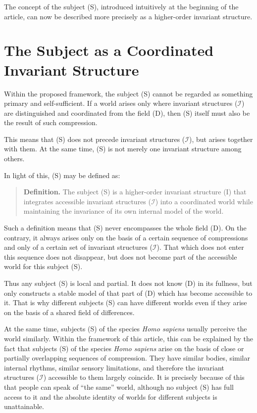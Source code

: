 \documentclass[aps,prd,onecolumn,nofootinbib,superscriptaddress]{revtex4-2} %
\begin{document}
    The concept of the subject (S), introduced intuitively at the beginning of the article, can now be described more precisely as a higher-order invariant structure.


    \section{The Subject as a Coordinated Invariant Structure}
    Within the proposed framework, the subject (S) cannot be regarded as something primary and self-sufficient. If a world arises only where invariant structures ($\mathcal{I}$) are distinguished and coordinated from the field (D), then (S) itself must also be the result of such compression.

    This means that (S) does not precede invariant structures ($\mathcal{I}$), but arises together with them. At the same time, (S) is not merely one invariant structure among others.

    In light of this, (S) may be defined as:
    \begin{quote}
        \textbf{Definition.}
        The subject (S) is a higher-order invariant structure (I) that integrates accessible invariant structures ($\mathcal{I}$) into a coordinated world while maintaining the invariance of its own internal model of the world.
    \end{quote}

    Such a definition means that (S) never encompasses the whole field (D). On the contrary, it always arises only on the basis of a certain sequence of compressions and only of a certain set of invariant structures ($\mathcal{I}$). That which does not enter this sequence does not disappear, but does not become part of the accessible world for this subject (S).

    Thus any subject (S) is local and partial. It does not know (D) in its fullness, but only constructs a stable model of that part of (D) which has become accessible to it. That is why different subjects (S) can have different worlds even if they arise on the basis of a shared field of differences.

    At the same time, subjects (S) of the species \emph{Homo sapiens} usually perceive the world similarly. Within the framework of this article, this can be explained by the fact that subjects (S) of the species \emph{Homo sapiens} arise on the basis of close or partially overlapping sequences of compression. They have similar bodies, similar internal rhythms, similar sensory limitations, and therefore the invariant structures ($\mathcal{I}$) accessible to them largely coincide. It is precisely because of this that people can speak of “the same” world, although no subject (S) has full access to it and the absolute identity of worlds for different subjects is unattainable.
\end{document}
